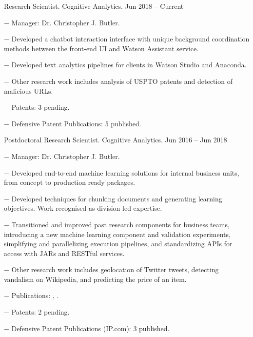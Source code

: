 \documentclass[10pt]{article}
\newcommand{\halfblankline}{\quad\vspace{-0.5\baselineskip}\pagebreak[3]}
\begin{document}
\begin{innerlist}
	\item Research Scientist. Cognitive Analytics. \hfill {Jun 2018 -- Current}
	\begin{innerlist}
		\item[$-$] Manager: Dr. Christopher J. Butler.
		\item[$-$] Developed a chatbot interaction interface with unique background coordination methods between the front-end UI and Watson Assistant service.
    \item[$-$] Developed text analytics pipelines for clients in Watson Studio and Anaconda.
    \item[$-$] Other research work includes analysis of USPTO patents and detection of malicious URLs.
    \item[$-$] Patents: 3 pending.
    \item[$-$] Defensive Patent Publications: 5 published.
  \end{innerlist}

  \halfblankline

	\item Postdoctoral Research Scientist. Cognitive Analytics. \hfill {Jun 2016 -- Jun 2018}
	\begin{innerlist}
		\item[$-$] Manager: Dr. Christopher J. Butler.
		\item[$-$] Developed end-to-end machine learning solutions for internal business units, from concept to production ready packages.
		\item[$-$] Developed techniques for chunking documents and generating learning objectives. Work recognised as division led expertise.
		\item[$-$] Transitioned and improved past research components for business teams, introducing a new machine learning component and validation experiments, simplifying and parallelizing execution pipelines, and standardizing APIs for access with JARs and RESTful services.
		\item[$-$] Other research work includes geolocation of Twitter tweets, detecting vandalism on Wikipedia, and predicting the price of an item.
		\item[$-$] Publications: \cite{Lau2017}, \cite{Tran2018}.
    \item[$-$] Patents: 2 pending. %
    \item[$-$] Defensive Patent Publications (IP.com): 3 published.
  \end{innerlist}
\end{innerlist}
\end{document}
